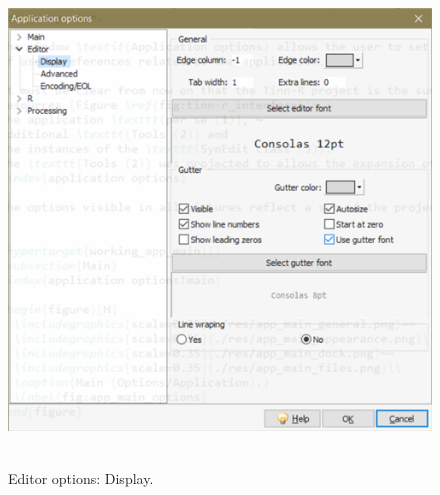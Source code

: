 \begin{figure}[H]
  \includegraphics[scale=0.80]{./res/app_editor_display.png}~~
  \caption{Editor options: Display.}
  \label{fig:editor_display}
\end{figure}

